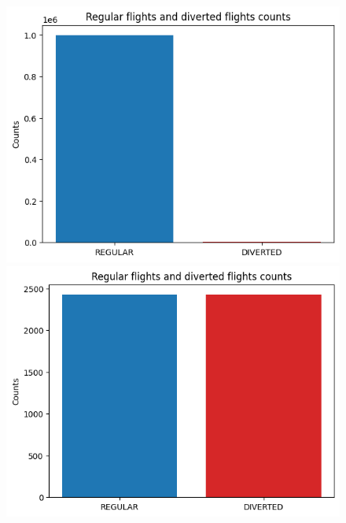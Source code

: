 \documentclass[
	letterpaper, %
	10pt, %
]{class}
\begin{document}
\begin{figure}[!htb]
    \centering
      \includegraphics[width=\linewidth]{../images/diverted_unbalanced.png}
    \endminipage\hfill
      \includegraphics[width=\linewidth]{../images/diverted_balanced.png}
    \endminipage\hfill
\end{figure}
\end{document}
